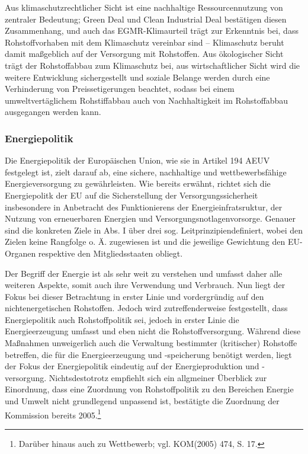 \documentclass[12pt,a4paper,oneside]{book} %
\begin{document}
Aus klimaschutzrechtlicher Sicht ist eine nachhaltige Ressourcennutzung von zentraler Bedeutung; Green Deal und Clean Industrial Deal bestätigen diesen Zusammenhang, und auch das EGMR-Klimaurteil trägt zur Erkenntnis bei, dass Rohstoffvorhaben mit dem Klimaschutz vereinbar sind -- \glqq Klimaschutz beruht damit maßgeblich auf der Versorgung mit Rohstoffen\grqq.\autocite{Frenz 2025, S. 114} Aus ökologischer Sicht trägt der Rohstoffabbau zum Klimaschutz bei, aus wirtschaftlicher Sicht wird die weitere Entwicklung sichergestellt und soziale Belange werden durch eine Verhinderung von Preissetigerungen beachtet, sodass bei einem umweltvertäglichem Rohstiffabbau auch von Nachhaltigkeit im Rohstoffabbau ausgegangen werden kann.\autocite{Frenz 2025, S. 121} 
	
	
\subsubsection{Energiepolitik}
Die Energiepolitik der Europäischen Union, wie sie in Artikel 194 AEUV festgelegt ist, zielt darauf ab, eine sichere, nachhaltige und wettbewerbsfähige Energieversorgung zu gewährleisten. Wie bereits erwähnt, richtet sich die Energiepolitk der EU auf die Sicherstellung der Versorgungssicherheit insbesondere in Anbetracht des Funktionierens der Energieinfratsruktur, der Nutzung von erneuerbaren Energien und Versorgungsnotlagenvorsorge.\autocite[387]{frau_rohstoffe_2025} Genauer sind die konkreten Ziele in Abs. I über drei sog. \glqq Leitprinzipien\grqq definiert, wobei den Zielen keine Rangfolge o. Ä. zugewiesen ist und die jeweilige Gewichtung den EU-Organen respektive den Mitgliedsstaaten obliegt.\autocite[Gundel § M Rn. 26 27]{dauses_handbuch_2024} 

Der Begriff der Energie ist als sehr weit zu verstehen und umfasst daher alle weiteren Aspekte, somit auch ihre Verwendung und Verbrauch.\autocite[Hamer Art. 194 Rn 8]{von_der_groeben_europaisches_2024} Nun liegt der Fokus bei dieser Betrachtung in erster Linie und vordergründig auf den nichtenergetischen Rohstoffen.
Jedoch wird  zutreffenderweise festgestellt, dass Energiepolitik auch Rohstoffpolitik sei, jedoch in erster Linie die Energieerzeugung umfasst und eben nicht die  Rohstoffversorgung. Während diese Maßnahmen unweigerlich auch die Verwaltung bestimmter (kritischer) Rohstoffe betreffen, die für die Energieerzeugung und -speicherung benötigt werden, liegt der Fokus der Energiepolitik eindeutig auf der Energieproduktion und -versorgung. Nichtsdestotrotz empfiehlt sich ein allgmeiner Überblick zur Einordnung, dass eine Zuordnung von Rohstoffpolitik zu den Bereichen Energie und Umwelt nicht grundlegend unpassend ist, bestätigte die Zuordnung der Kommission bereits 2005.\footnote{Darüber hinaus auch zu Wettbewerb; vgl. KOM(2005) 474, S. 17.}
\end{document}
